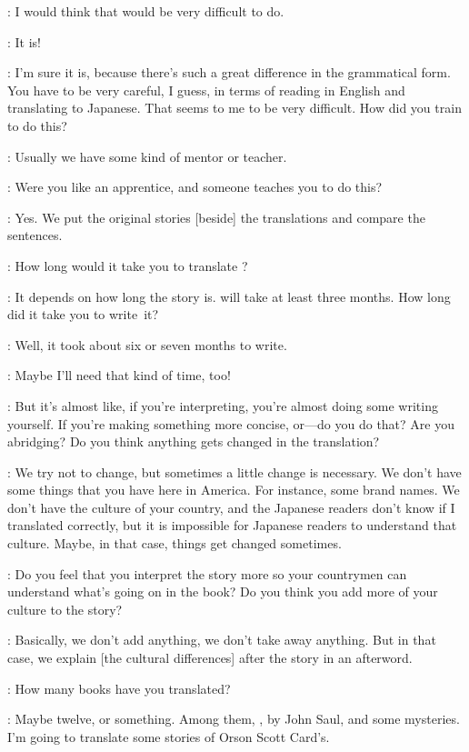 \RM:  I would think that would be very difficult to do.

\KT:  It is!

\RM:  I'm sure it is, because there's such a great difference in the grammatical
form.  You have to be very careful, I guess, in terms of reading in English and
translating to Japanese.  That seems to me to be very difficult.  How did you
train to do this?

\KT:  Usually we have some kind of mentor or teacher.

\RM:  Were you like an apprentice, and someone teaches you to do this?

\KT:  Yes.  We put the original stories [beside] the translations and compare
the sentences.

\RM:  How long would it take you to translate ?

\KT:  It depends on how long the story is.   will take at
least three months.  How long did it take you to write~it?

\RM:  Well, it took about six or seven months to write.

\KT:  Maybe I'll need that kind of time, too!

\RM:  But it's almost like, if you're interpreting, you're almost doing some
writing yourself.  If you're making something more concise, or---do you do that?
Are you abridging?  Do you think anything gets changed in the translation?

\KT:  We try not to change, but sometimes a little change is necessary.  We
don't have some things that you have here in America.  For instance, some brand
names.  We don't have the culture of your country, and the Japanese readers
don't know if I translated correctly, but it is impossible for Japanese readers
to understand that culture.  Maybe, in that case, things get changed sometimes.

\RM:  Do you feel that you interpret the story more so your countrymen can
understand what's going on in the book?  Do you think you add more of your
culture to the story?

\KT:  Basically, we don't add anything, we don't take away anything.  But in
that case, we explain [the cultural differences] after the story in an
afterword.

\RM:  How many books have you translated?

\KT:  Maybe twelve, or something.  Among them, , by John Saul,
and some mysteries.  I'm going to translate some stories of Orson Scott Card's.

